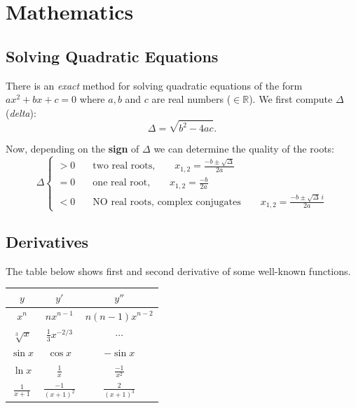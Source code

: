 \documentclass[a4paper,11pt]{article}
\begin{document}
\section{Mathematics}

\subsection{Solving Quadratic Equations}

There is an \textit{exact} method for solving quadratic equations of the form $ax^2+bx+c=0$ where $a, b$ and $c$ are real numbers ($\in \mathbb{R}$). We first compute $\Delta$ (\textit{delta}):
\begin{equation} \Delta = \sqrt{b^2-4ac}. \end{equation}

Now, depending on the \textbf{sign} of $\Delta$ we can determine the quality of the roots:
\begin{equation*}
\Delta 
\begin{cases}
>0 & \quad \textrm{two real roots,} \qquad x_{1,2}=\frac{-b \pm \sqrt{\Delta}}{2a}\\
=0 & \quad \textrm{one real root,} \qquad x_{1,2}=\frac{-b}{2a}\\
<0 & \quad \textrm{NO real roots, complex conjugates} \qquad x_{1,2}=\frac{-b \pm \sqrt{\Delta}\,i}{2a}
\end{cases}
\end{equation*} 
 
\subsection{Derivatives}

The table below shows first and second derivative of some well-known functions.

\begin{table}[h]
\centering
\begin{tabular}{|c|c|c|}
\hline
 $y$ & $y'$ & $y''$\\
\hline
$x^n$ & $nx^{n-1}$ & $n(n-1)x^{n-2}$\\
$\sqrt[3]{x}$ & $\frac{1}{3}x^{-2/3}$ & $\cdots$ \\
$\sin x$ & $\cos x$ & $-\sin x$\\
$\ln x$ & $\frac{1}{x}$ & $\frac{-1}{x^2}$\\
$\frac{1}{x+1}$ & $\frac{-1}{(x+1)^2}$ & $\frac{2}{(x+1)^3}$\\
\hline
\end{tabular}
\end{table}
\end{document}
